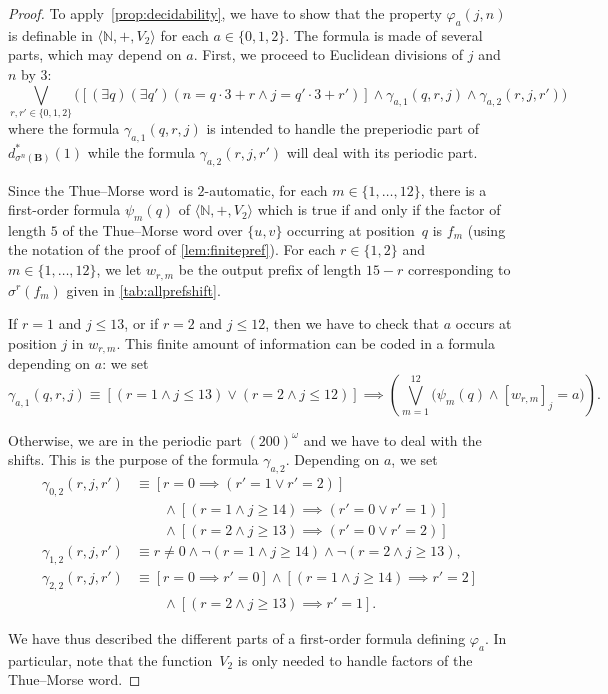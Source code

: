 \documentclass[12pt,reqno]{amsart}
\newcommand{\B}{{\mathbf{B}}}
\begin{document}
\begin{proof}
    To apply~\cref{prop:decidability}, we have to show that the property $\varphi_a(j,n)$ is definable in $\langle\mathbb{N},+,V_2\rangle$ for each $a\in\{0,1,2\}$. The formula is made of several parts, which may depend on $a$. 
    First, we proceed to Euclidean divisions of $j$ and $n$ by $3$:
     \[
        \bigvee_{r,r'\in\{0,1,2\}} \Big([(\exists q)(\exists q')(n=q\cdot 3+r\wedge j=q'\cdot 3+r')]\wedge 
        \gamma_{a,1}(q,r,j)\wedge\gamma_{a,2}(r,j,r')
        \Big)
    \] 
    where the formula $\gamma_{a,1}(q,r,j)$ is intended to handle the preperiodic part of $d_{\sigma^n(\B)}^*(1)$ while the formula $\gamma_{a,2}(r,j,r')$ will deal with its periodic part.
        
    Since the Thue--Morse word is $2$-automatic, for each $m\in\{1,\ldots,12\}$, there is a first-order formula $\psi_m(q)$ of $\langle\mathbb{N},+,V_2\rangle$ which is true if and only if the factor of length $5$ of the Thue--Morse word over $\{u,v\}$ occurring at position~$q$ is $f_m$ (using the notation of the proof of \cref{lem:finitepref}). For each $r\in\{1,2\}$ and $m\in\{1,\ldots,12\}$, we let $w_{r,m}$ be the output prefix of length $15-r$ corresponding to $\sigma^r(f_m)$ given in \cref{tab:allprefshift}.  
    
    If $r=1$ and $j\le 13$, or if $r=2$ and $j\le 12$, then we have to check that $a$ occurs at position $j$ in $w_{r,m}$. This finite amount of information can be coded in a formula depending on $a$: we set 
    \[
        \gamma_{a,1}(q,r,j)\equiv [(r=1\wedge j\le 13)\vee (r=2\wedge j\le 12)] \implies
            \left( \bigvee_{m=1}^{12} \big(\psi_m(q)\wedge [w_{r,m}]_j=a\big)\right).
    \]

    Otherwise, we are in the periodic part $(200)^\omega$ and we have to deal with the shifts. This is the purpose of the formula $\gamma_{a,2}$. Depending on $a$, we set
    \begin{align*}
        \gamma_{0,2}(r,j,r') 
            & \equiv [r=0\implies (r'=1\vee r'=2)] \\
            & \qquad \wedge [(r=1 \wedge j\ge 14) \implies (r'=0\vee r'=1)] \\
            & \qquad \wedge [(r=2 \wedge j\ge 13) \implies (r'=0\vee r'=2)] \\
        \gamma_{1,2}(r,j,r') 
            & \equiv r\ne 0 \wedge \neg(r=1 \wedge j\ge 14) \wedge \neg(r=2 \wedge j\ge 13), \\
        \gamma_{2,2}(r,j,r') 
            & \equiv [r=0\implies r'=0]\wedge [(r=1 \wedge j\ge 14) \implies r'=2] \\
            & \qquad \wedge [(r=2 \wedge j\ge 13) \implies r'=1].
    \end{align*}
    
    We have thus described the different parts of a first-order formula defining $\varphi_a$. In particular, note that the function~$V_2$ is only needed to handle factors of the Thue--Morse word.
\end{proof}
\end{document}

